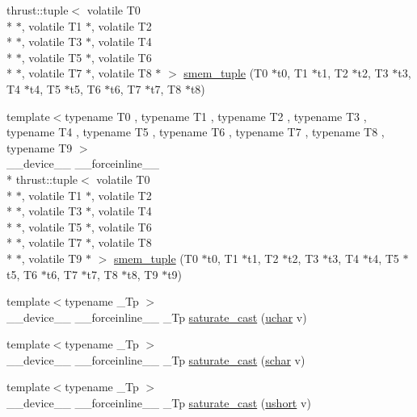 \begin{DoxyCompactItemize}
thrust\-::tuple$<$ volatile T0 \\*
$\ast$, volatile T1 $\ast$, volatile T2 \\*
$\ast$, volatile T3 $\ast$, volatile T4 \\*
$\ast$, volatile T5 $\ast$, volatile T6 \\*
$\ast$, volatile T7 $\ast$, volatile T8 $\ast$ $>$ \hyperlink{namespacecv_1_1gpu_1_1device_a5dcc74addd4efbd2f1863655e6291015}{smem\-\_\-tuple} (T0 $\ast$t0, T1 $\ast$t1, T2 $\ast$t2, T3 $\ast$t3, T4 $\ast$t4, T5 $\ast$t5, T6 $\ast$t6, T7 $\ast$t7, T8 $\ast$t8)
\item 
{\footnotesize template$<$typename T0 , typename T1 , typename T2 , typename T3 , typename T4 , typename T5 , typename T6 , typename T7 , typename T8 , typename T9 $>$ }\\\-\_\-\-\_\-device\-\_\-\-\_\- \-\_\-\-\_\-forceinline\-\_\-\-\_\- \\*
thrust\-::tuple$<$ volatile T0 \\*
$\ast$, volatile T1 $\ast$, volatile T2 \\*
$\ast$, volatile T3 $\ast$, volatile T4 \\*
$\ast$, volatile T5 $\ast$, volatile T6 \\*
$\ast$, volatile T7 $\ast$, volatile T8 \\*
$\ast$, volatile T9 $\ast$ $>$ \hyperlink{namespacecv_1_1gpu_1_1device_a8c79f5537969f5770b30298e45e4f8fd}{smem\-\_\-tuple} (T0 $\ast$t0, T1 $\ast$t1, T2 $\ast$t2, T3 $\ast$t3, T4 $\ast$t4, T5 $\ast$t5, T6 $\ast$t6, T7 $\ast$t7, T8 $\ast$t8, T9 $\ast$t9)
\item 
{\footnotesize template$<$typename \-\_\-\-Tp $>$ }\\\-\_\-\-\_\-device\-\_\-\-\_\- \-\_\-\-\_\-forceinline\-\_\-\-\_\- \-\_\-\-Tp \hyperlink{namespacecv_1_1gpu_1_1device_aad5e6b794784ec0e90cdcca7d8d8a7de}{saturate\-\_\-cast} (\hyperlink{core_2types__c_8h_a65f85814a8290f9797005d3b28e7e5fc}{uchar} v)
\item 
{\footnotesize template$<$typename \-\_\-\-Tp $>$ }\\\-\_\-\-\_\-device\-\_\-\-\_\- \-\_\-\-\_\-forceinline\-\_\-\-\_\- \-\_\-\-Tp \hyperlink{namespacecv_1_1gpu_1_1device_a88da2cc48702f15ac4426a06f9139f60}{saturate\-\_\-cast} (\hyperlink{core_2types__c_8h_a0fd9ce9d735064461bebfe6037026093}{schar} v)
\item 
{\footnotesize template$<$typename \-\_\-\-Tp $>$ }\\\-\_\-\-\_\-device\-\_\-\-\_\- \-\_\-\-\_\-forceinline\-\_\-\-\_\- \-\_\-\-Tp \hyperlink{namespacecv_1_1gpu_1_1device_aadc5d9ca5c4fb76e03e8fdd4c8be989a}{saturate\-\_\-cast} (\hyperlink{core_2types__c_8h_ab95f123a6c9bcfee6a343170ef8c5f69}{ushort} v)

\end{DoxyCompactItemize}
